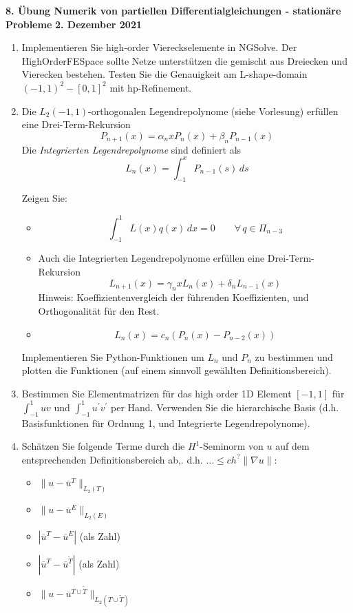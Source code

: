 \documentclass[11pt,a4paper]{report}
\begin{document}
\begin{center}
\textbf{8. \"Ubung Numerik von partiellen Differentialgleichungen - station\"are Probleme} \newline 
\textbf{2. Dezember 2021}
\end{center}

\setcounter{enumi}{4}

\begin{enumerate}

\item Implementieren Sie high-order Viereckselemente in
  NGSolve. Der HighOrderFESpace sollte Netze unterst\"utzen die
  gemischt aus Dreiecken und Vierecken bestehen.
  Testen Sie die Genauigkeit am L-shape-domain $(-1,1)^2 - [0,1]^2$ mit hp-Refinement.

\item Die $L_2(-1,1)$-orthogonalen Legendrepolynome (siehe Vorlesung)
  erf\"ullen eine Drei-Term-Rekursion
  $$
  P_{n+1}(x) = \alpha_n x P_n(x) + \beta_n P_{n-1} (x)
  $$
  Die {\em Integrierten Legendrepolynome} sind definiert als
  $$
  L_n(x) = \int_{-1}^x P_{n-1} (s) \, {ds}
  $$

  Zeigen Sie:
  \begin{itemize}
  \item
    $$
    \int_{-1}^1 L(x) q(x) \, dx = 0 \qquad \forall \, q \in \Pi_{n-3}
    $$
  \item
    Auch die Integrierten Legendrepolynome erf\"ullen eine Drei-Term-Rekursion
    $$
    L_{n+1}(x) = \gamma_n x L_n(x) + \delta_n L_{n-1}(x)
    $$
    Hinweis: Koeffizientenvergleich der f\"uhrenden Koeffizienten, und
    Orthogonalit\"at f\"ur den Rest.
  \item 
    $$
    L_n(x) = c_n (P_n(x) - P_{n-2}(x))
    $$
  \end{itemize}
  Implementieren Sie Python-Funktionen um $L_n$ und $P_n$ zu bestimmen und
  plotten die Funktionen (auf einem sinnvoll gew\"ahlten Definitionsbereich).
\item
  Bestimmen Sie Elementmatrizen f\"ur das high order 1D Element
  $[-1,1]$  f\"ur $\int_{-1}^1 uv$ und $\int_{-1}^1
  u^\prime v^\prime$ per Hand. Verwenden Sie die hierarchische Basis
  (d.h. Basisfunktionen f\"ur Ordnung 1, und Integrierte Legendrepolynome).

\item Sch\"atzen Sie folgende Terme durch die $H^1$-Seminorm von $u$
  auf dem entsprechenden Definitionsbereich ab,. d.h.  $\ldots \leq c h^? \| \nabla u \|$:
    \begin{itemize}
  \item 
    $\| u - \overline{u}^T \|_{L_2(T)}$
  \item 
    $\| u - \overline{u}^E \|_{L_2(E)}$
  \item
   $| \overline{u}^T - \overline{u}^E |$  \qquad (als Zahl) 
 \item
   $| \overline{u}^T - \overline{u}^{\tilde T} |$  \qquad (als Zahl) 
  \item 
    $\| u - \overline{u}^{T \cup \tilde T} \|_{L_2(T\cup \tilde T)}$


\end{itemize}
\end{enumerate}
\end{document}
